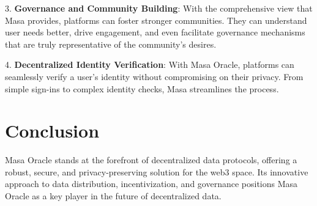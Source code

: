 \documentclass{article}
\begin{document}
3. \textbf{Governance and Community Building}: With the comprehensive view that Masa provides, platforms can foster stronger communities. They can understand user needs better, drive engagement, and even facilitate governance mechanisms that are truly representative of the community's desires.

4. \textbf{Decentralized Identity Verification}: With Masa Oracle, platforms can seamlessly verify a user's identity without compromising on their privacy. From simple sign-ins to complex identity checks, Masa streamlines the process.

\section{Conclusion}

Masa Oracle stands at the forefront of decentralized data protocols, offering a robust, secure, and privacy-preserving solution for the web3 space. Its innovative approach to data distribution, incentivization, and governance positions Masa Oracle as a key player in the future of decentralized data.
\end{document}
